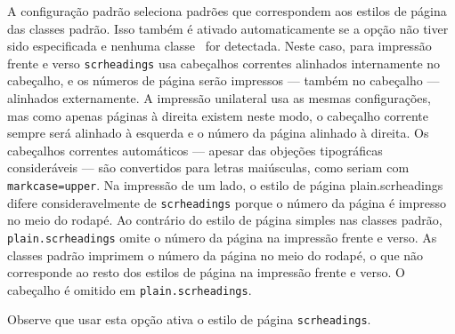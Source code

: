 A configuração padrão seleciona padrões que correspondem aos estilos de página das classes padrão. Isso também é ativado automaticamente se a opção não tiver sido especificada e nenhuma classe \KOMAScript\ for detectada. Neste caso, para impressão frente e verso \texttt{scrheadings} usa cabeçalhos correntes alinhados internamente no cabeçalho, e os números de página serão impressos --- também no cabeçalho --- alinhados externamente. A impressão unilateral usa as mesmas configurações, mas como apenas páginas à direita existem neste modo, o cabeçalho corrente sempre será alinhado à esquerda e o número da página alinhado à direita. Os cabeçalhos correntes automáticos --- apesar das objeções tipográficas consideráveis --- são convertidos para letras maiúsculas, como seriam com \texttt{markcase=upper}. Na impressão de um lado, o estilo de página plain.scrheadings difere consideravelmente de \texttt{scrheadings} porque o número da página é impresso no meio do rodapé. Ao contrário do estilo de página simples nas classes padrão, \texttt{plain.scrheadings} omite o número da página na impressão frente e verso. As classes padrão imprimem o número da página no meio do rodapé, o que não corresponde ao resto dos estilos de página na impressão frente e verso. O cabeçalho é omitido em \texttt{plain.scrheadings}.

Observe que usar esta opção ativa o estilo de página \texttt{scrheadings}.


